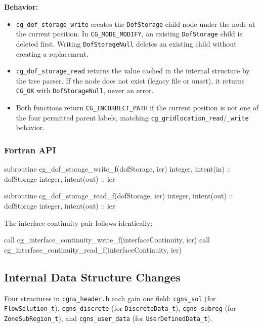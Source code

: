 \documentclass[11pt,letterpaper]{article}
\makeatletter
\let\cgns@orig@lstlisting\lstlisting
\let\cgns@endorig@lstlisting\endlstlisting
\renewenvironment{lstlisting}
  {\par\needspace{5\baselineskip}\nolinenumbers\cgns@orig@lstlisting}
  {\cgns@endorig@lstlisting\par\linenumbers}
\makeatother
\begin{document}
\textbf{Behavior:}

\begin{itemize}[leftmargin=2em]
\item \texttt{cg\_dof\_storage\_write} creates the
  \texttt{DofStorage} child node under the node at the current
  position.  In \texttt{CG\_MODE\_MODIFY}, an existing
  \texttt{DofStorage} child is deleted first.  Writing
  \texttt{DofStorageNull} deletes an existing child without creating a
  replacement.

\item \texttt{cg\_dof\_storage\_read} returns the value cached in the
  internal structure by the tree parser.  If the node does not exist
  (legacy file or unset), it returns \texttt{CG\_OK} with
  \texttt{DofStorageNull}, never an error.

\item Both functions return \texttt{CG\_INCORRECT\_PATH} if the current
  position is not one of the four permitted parent labels, matching
  \texttt{cg\_gridlocation\_read}/\texttt{\_write} behavior.
\end{itemize}

\subsubsection{Fortran API}

\begin{lstlisting}[language=Fortran]
subroutine cg_dof_storage_write_f(dofStorage, ier)
  integer, intent(in)  :: dofStorage
  integer, intent(out) :: ier

subroutine cg_dof_storage_read_f(dofStorage, ier)
  integer, intent(out) :: dofStorage
  integer, intent(out) :: ier
\end{lstlisting}

The interface-continuity pair follows identically:

\begin{lstlisting}[language=Fortran]
call cg_interface_continuity_write_f(interfaceContinuity, ier)
call cg_interface_continuity_read_f(interfaceContinuity, ier)
\end{lstlisting}

\subsection{Internal Data Structure Changes}

Four structures in \texttt{cgns\_header.h} each gain one field:
\texttt{cgns\_sol} (for \texttt{FlowSolution\_t}),
\texttt{cgns\_discrete} (for \texttt{DiscreteData\_t}),
\texttt{cgns\_subreg} (for \texttt{ZoneSubRegion\_t}), and
\texttt{cgns\_user\_data} (for \texttt{UserDefinedData\_t}).
\end{document}
